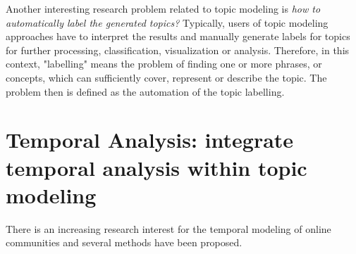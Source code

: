Another interesting research problem related to topic modeling is \textit{how to automatically label the generated topics?} \cite{chp2cano2014automatictopiclabeling} \cite{chp2hulpus2013unsupervisedtopiclabeling} \cite{chp2aletras2014labelling} \cite{chp6OnConceptualLabelingOfBagOfWords} \cite{chp2lau2011automaticlabeling} 
Typically, users of topic modeling approaches have to interpret the results and manually generate labels for topics for further processing, classification, visualization or analysis. Therefore, in this context, "labelling" means the problem of finding one or more phrases, or concepts, which can sufficiently cover, represent or describe the topic. The problem then is defined as the automation of the topic labelling.




\section{Temporal Analysis: integrate temporal analysis within topic modeling}

There is an increasing research interest for the temporal modeling of online communities and several methods have been proposed. 

